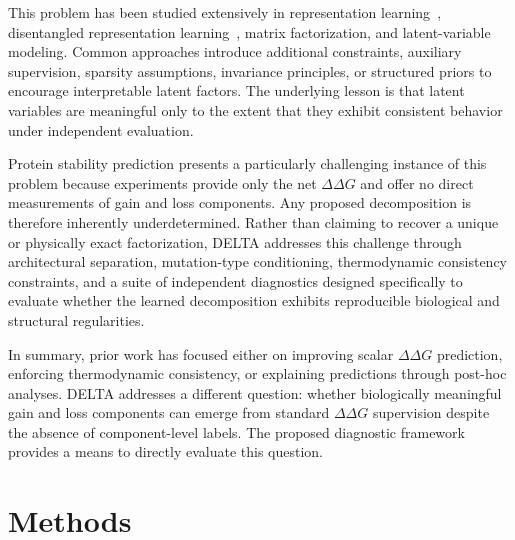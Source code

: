 \documentclass[11pt,a4paper]{article}
\theoremstyle{plain}
\theoremstyle{definition}
\begin{document}
This problem has been studied extensively in representation learning~\cite{bengio2013representation}, disentangled representation learning~\cite{kim2018disentangling}, matrix factorization, and latent-variable modeling. Common approaches introduce additional constraints, auxiliary supervision, sparsity assumptions, invariance principles, or structured priors to encourage interpretable latent factors. The underlying lesson is that latent variables are meaningful only to the extent that they exhibit consistent behavior under independent evaluation.

Protein stability prediction presents a particularly challenging instance of this problem because experiments provide only the net $\Delta\Delta G$ and offer no direct measurements of gain and loss components. Any proposed decomposition is therefore inherently underdetermined. Rather than claiming to recover a unique or physically exact factorization, DELTA addresses this challenge through architectural separation, mutation-type conditioning, thermodynamic consistency constraints, and a suite of independent diagnostics designed specifically to evaluate whether the learned decomposition exhibits reproducible biological and structural regularities.

In summary, prior work has focused either on improving scalar $\Delta\Delta G$ prediction, enforcing thermodynamic consistency, or explaining predictions through post-hoc analyses. DELTA addresses a different question: whether biologically meaningful gain and loss components can emerge from standard $\Delta\Delta G$ supervision despite the absence of component-level labels. The proposed diagnostic framework provides a means to directly evaluate this question.

\section{Methods}
\label{sec:methods}
\end{document}
